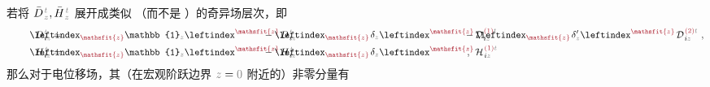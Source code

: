 若将 $\bar{D}^{\;\!\mathcolor{gray}{t}}_{\;\!\mathcolor{gray}{z}}, \bar{H}^{\;\!\mathcolor{gray}{t}}_{\;\!\mathcolor{gray}{z}}$ 展开成类似 （而不是 ）的奇异场层次，即
\begin{subequations} \label{eq:DH-01'}
\begin{align}
	\hphantom{xxxxx} D^{\;\!\mathcolor{gray}{t}}_{\;\! i\mathcolor{gray}{z}} &= \hspace{0.2em} &&\hspace{-4.5em}\leftindex_{\textcolor{Maroon}{\mathsfit{z}}} {\mathbb{1}}_{\mathcolor{gray}{z}} \leftindex^{\textcolor{Maroon}{\mathsfit{z}}} \;\! D^{\;\!\mathcolor{gray}{t}}_{\;\! i\mathcolor{gray}{z}} &&\hspace{-4.5em}- \leftindex_{\textcolor{Maroon}{\mathsfit{z}}} \;\! \delta_{\mathcolor{gray}{z}} \leftindex^{\textcolor{Maroon}{\mathsfit{z}}} \;\!
	{\mathcal{D}}^{\;\!\textcolor{Maroon}{(1)}\mathcolor{gray}{t}}_{\;\! i\mathcolor{gray}{z}} &&\hspace{-4.5em}- \leftindex_{\textcolor{Maroon}{\mathsfit{z}}} \;\! \delta'_{\mathcolor{gray}{z}} \leftindex^{\textcolor{Maroon}{\mathsfit{z}}} \;\! {\mathcal{D}}^{\;\!\textcolor{Maroon}{(2)}\mathcolor{gray}{t}}_{\;\! i\mathcolor{gray}{z}} ~, \label{eq:D-01'} \\
	\hphantom{xxxxx} H^{\;\!\mathcolor{gray}{t}}_{\;\! i\mathcolor{gray}{z}} &= \hspace{0.2em} &&\hspace{-4.5em}\leftindex_{\textcolor{Maroon}{\mathsfit{z}}} {\mathbb{1}}_{\mathcolor{gray}{z}} \leftindex^{\textcolor{Maroon}{\mathsfit{z}}} \;\! H^{\;\!\mathcolor{gray}{t}}_{\;\! i\mathcolor{gray}{z}} &&\hspace{-4.5em}- \leftindex_{\textcolor{Maroon}{\mathsfit{z}}} \;\! \delta_{\mathcolor{gray}{z}} \leftindex^{\textcolor{Maroon}{\mathsfit{z}}} \;\!
	{\mathcal{H}}^{\;\!\textcolor{Maroon}{(1)}\mathcolor{gray}{t}}_{\;\! i\mathcolor{gray}{z}} &&\hspace{-4.5em}~, \label{eq:H-01'}
\end{align}
\end{subequations}
那么对于电位移场，其（在宏观阶跃边界 $\mathcolor{gray}{z \mathcolor{black}{=} 0}$ 附近的）非零分量有
